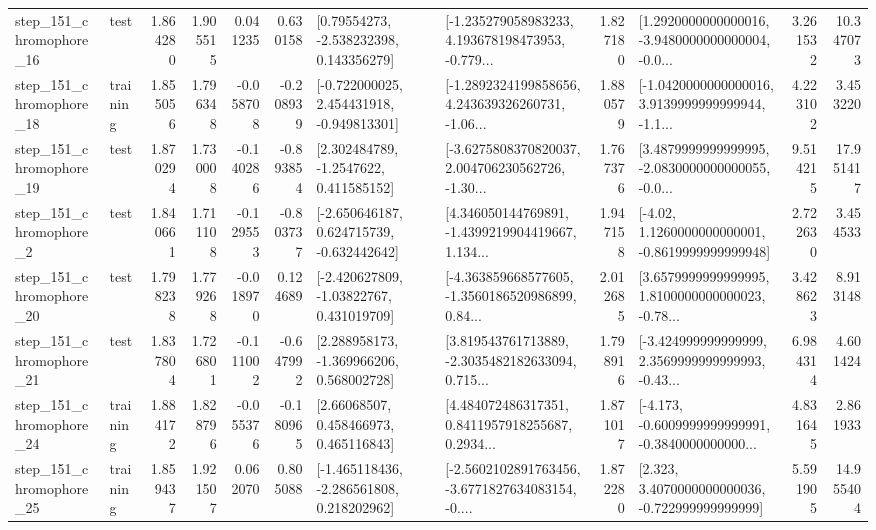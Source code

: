 \begin{tabular}{llrrrrllrlrr}
  step\_151\_chromophore\_16 &      test &      1.864280 &    1.905515 &      0.041235 &  0.630158 &     [0.79554273, -2.538232398, 0.143356279] &  [-1.235279058983233, 4.193678198473953, -0.779... &       1.827180 &  [1.2920000000000016, -3.9480000000000004, -0.0... &            3.261532 &         10.347073 \\
  step\_151\_chromophore\_18 &  training &      1.855056 &    1.796348 &     -0.058708 & -0.208939 &   [-0.722000025, 2.454431918, -0.949813301] &  [-1.2892324199858656, 4.243639326260731, -1.06... &       1.880579 &  [-1.0420000000000016, 3.9139999999999944, -1.1... &            4.223102 &          3.453220 \\
  step\_151\_chromophore\_19 &      test &      1.870294 &    1.730008 &     -0.140286 & -0.893854 &      [2.302484789, -1.2547622, 0.411585152] &  [-3.6275808370820037, 2.004706230562726, -1.30... &       1.767376 &  [3.4879999999999995, -2.0830000000000055, -0.0... &            9.514215 &         17.951417 \\
   step\_151\_chromophore\_2 &      test &      1.840661 &    1.711108 &     -0.129553 & -0.803737 &   [-2.650646187, 0.624715739, -0.632442642] &  [4.346050144769891, -1.4399219904419667, 1.134... &       1.947158 &   [-4.02, 1.1260000000000001, -0.8619999999999948] &            2.722630 &          3.454533 \\
  step\_151\_chromophore\_20 &      test &      1.798238 &    1.779268 &     -0.018970 &  0.124689 &    [-2.420627809, -1.03822767, 0.431019709] &  [-4.363859668577605, -1.3560186520986899, 0.84... &       2.012685 &  [3.6579999999999995, 1.8100000000000023, -0.78... &            3.428623 &          8.913148 \\
  step\_151\_chromophore\_21 &      test &      1.837804 &    1.726801 &     -0.111002 & -0.647992 &    [2.288958173, -1.369966206, 0.568002728] &  [3.819543761713889, -2.3035482182633094, 0.715... &       1.798916 &  [-3.424999999999999, 2.3569999999999993, -0.43... &            6.984314 &          4.601424 \\
  step\_151\_chromophore\_24 &  training &      1.884172 &    1.828796 &     -0.055376 & -0.180965 &      [2.66068507, 0.458466973, 0.465116843] &  [4.484072486317351, 0.8411957918255687, 0.2934... &       1.871017 &  [-4.173, -0.6009999999999991, -0.3840000000000... &            4.831645 &          2.861933 \\
  step\_151\_chromophore\_25 &  training &      1.859437 &    1.921507 &      0.062070 &  0.805088 &   [-1.465118436, -2.286561808, 0.218202962] &  [-2.5602102891763456, -3.6771827634083154, -0.... &       1.872280 &    [2.323, 3.4070000000000036, -0.722999999999999] &            5.591905 &         14.955404 \\

\end{tabular}
